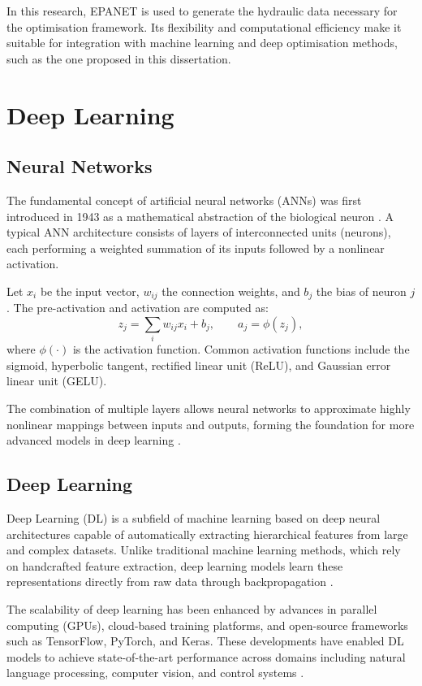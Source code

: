 In this research, EPANET is used to generate the hydraulic data necessary for the optimisation framework. Its flexibility and computational efficiency make it suitable for integration with machine learning and deep optimisation methods, such as the one proposed in this dissertation.

\section{Deep Learning}

\subsection{Neural Networks}

The fundamental concept of artificial neural networks (ANNs) was first introduced in 1943 as a mathematical abstraction of the biological neuron \cite{rfc23}. A typical ANN architecture consists of layers of interconnected units (neurons), each performing a weighted summation of its inputs followed by a nonlinear activation. 

Let $x_i$ be the input vector, $w_{ij}$ the connection weights, and $b_j$ the bias of neuron $j$. The pre-activation and activation are computed as:
\[
z_j = \sum_i w_{ij}x_i + b_j, \qquad a_j = \phi(z_j),
\]
where $\phi(\cdot)$ is the activation function. Common activation functions include the sigmoid, hyperbolic tangent, rectified linear unit (ReLU), and Gaussian error linear unit (GELU).

The combination of multiple layers allows neural networks to approximate highly nonlinear mappings between inputs and outputs, forming the foundation for more advanced models in deep learning \cite{rfc27}.

\subsection{Deep Learning}

Deep Learning (DL) is a subfield of machine learning based on deep neural architectures capable of automatically extracting hierarchical features from large and complex datasets. Unlike traditional machine learning methods, which rely on handcrafted feature extraction, deep learning models learn these representations directly from raw data through backpropagation \cite{rfc22, rfc23, rfc24}.

The scalability of deep learning has been enhanced by advances in parallel computing (GPUs), cloud-based training platforms, and open-source frameworks such as TensorFlow, PyTorch, and Keras. These developments have enabled DL models to achieve state-of-the-art performance across domains including natural language processing, computer vision, and control systems \cite{rfc26}.

